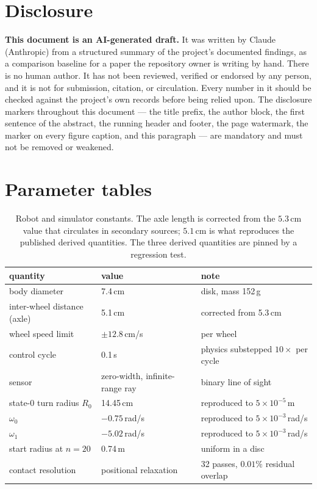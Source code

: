 \documentclass[11pt,a4paper]{article}
\begin{document}
\section*{Disclosure}

\begin{framed}
\noindent\textbf{This document is an AI-generated draft.} It was written by
Claude (Anthropic) from a structured summary of the project's documented
findings, as a comparison baseline for a paper the repository owner is writing
by hand. There is no human author. It has not been reviewed, verified or
endorsed by any person, and it is not for submission, citation, or circulation.
Every number in it should be checked against the project's own records before
being relied upon. The disclosure markers throughout this document --- the title
prefix, the author block, the first sentence of the abstract, the running header
and footer, the page watermark, the marker on every figure caption, and this
paragraph --- are mandatory and must not be removed or weakened.
\end{framed}

\appendix

\section{Parameter tables}
\label{app:params}

\begin{table}[h]
\centering
\caption{Robot and simulator constants. The axle length is corrected from the
$5.3$\,cm value that circulates in secondary sources; $5.1$\,cm is what
reproduces the published derived quantities. The three derived quantities are
pinned by a regression test.}
\small
\begin{tabular}{lll}
\toprule
quantity & value & note \\
\midrule
body diameter & 7.4\,cm & disk, mass 152\,g \\
inter-wheel distance (axle) & 5.1\,cm & corrected from 5.3\,cm \\
wheel speed limit & $\pm 12.8$\,cm/s & per wheel \\
control cycle & 0.1\,s & physics substepped $10\times$ per cycle \\
sensor & zero-width, infinite-range ray & binary line of sight \\
state-0 turn radius $R_0$ & 14.45\,cm & reproduced to $5\times10^{-5}$\,m \\
$\omega_0$ & $-0.75$\,rad/s & reproduced to $5\times10^{-3}$\,rad/s \\
$\omega_1$ & $-5.02$\,rad/s & reproduced to $5\times10^{-3}$\,rad/s \\
start radius at $n = 20$ & 0.74\,m & uniform in a disc \\
contact resolution & positional relaxation & 32 passes, $0.01\%$ residual overlap \\
\bottomrule
\end{tabular}
\end{table}
\end{document}
